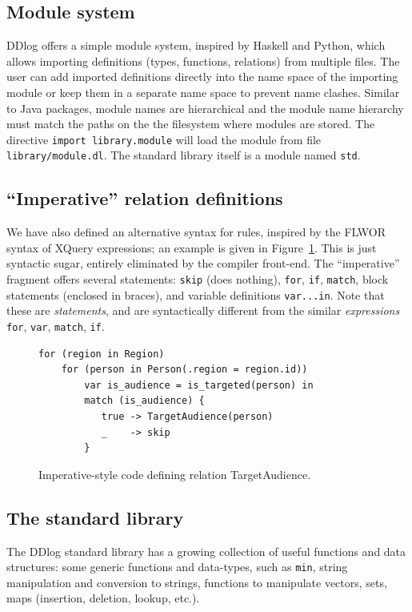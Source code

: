 \subsection{Module system}

DDlog offers a simple module system, inspired by Haskell and Python,
which allows importing definitions (types, functions, relations) from
multiple files.  The user can add imported definitions directly into the
name space of the importing module or keep them in a separate name space to
prevent name clashes.  Similar to Java packages, module names are
hierarchical and the module name hierarchy must match the paths on the
the filesystem where modules are stored.  The directive \texttt{import
  library.module} will load the module from file
\texttt{library/module.dl}.  The standard library itself is a module
named \texttt{std}.

\subsection{``Imperative'' relation definitions}

We have also defined an alternative syntax for rules,
inspired by the FLWOR syntax of XQuery expressions; an example is
given in Figure~\ref{fig:imperative}.  This is just syntactic sugar,
entirely eliminated by the compiler front-end.  The ``imperative''
fragment offers several statements: \texttt{skip} (does nothing),
\texttt{for}, \texttt{if}, \texttt{match}, block statements (enclosed
in braces), and variable definitions \texttt{var...in}.  Note that
these are \emph{statements}, and are syntactically different from the
similar \emph{expressions} \texttt{for}, \texttt{var}, \texttt{match},
\texttt{if}.

\begin{figure}[t]
  \small
  \begin{lstlisting}[language=ddlog]
for (region in Region) 
    for (person in Person(.region = region.id))
        var is_audience = is_targeted(person) in
        match (is_audience) {
           true -> TargetAudience(person)
           _    -> skip
        }    
  \end{lstlisting}
  \caption{Imperative-style code defining relation TargetAudience.\label{fig:imperative}}
\end{figure}

\subsection{The standard library}

The DDlog standard library has a growing collection of useful
functions and data structures: some generic functions and data-types,
such as \texttt{min}, string manipulation and conversion to strings,
functions to manipulate vectors, sets, maps (insertion, deletion,
lookup, etc.).
